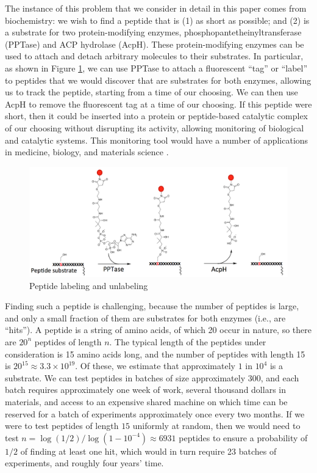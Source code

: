 \documentclass[opre,nonblindrev]{informs3} %
\begin{document}
The instance of this problem that we consider in detail in this paper comes from biochemistry: we wish to find a peptide that is (1) as short as possible; and (2) is a substrate for two protein-modifying enzymes, phosphopantetheinyltransferase (PPTase) and ACP hydrolase (AcpH). These protein-modifying enzymes can be used to attach and detach arbitrary molecules to their substrates.  In particular, as shown in Figure \ref{fig:labeling}, we can use PPTase to attach a fluorescent ``tag'' or ``label'' to peptides that we would discover that are substrates for both enzymes, allowing us to track the peptide, starting from a time of our choosing.  We can then use AcpH to remove the fluorescent tag at a time of our choosing.  If this peptide were short, then it could be inserted into a protein or peptide-based catalytic complex of our choosing without disrupting its activity, allowing monitoring of biological and catalytic systems.  This monitoring tool would have a number of applications in medicine, biology, and materials science \citep{nick}.

\begin{figure}[hpt] 
\center
\includegraphics[width=\textwidth]{pic/labeling.png}
\caption{ Peptide labeling and unlabeling}
\label{fig:labeling}
\end{figure}

Finding such a peptide is challenging, because the number of peptides is large, and only a small fraction of them are substrates for both enzymes (i.e., are ``hits'').  A peptide is a string of amino acids, of which 20 occur in nature, so there are $20^n$ peptides of length $n$.  The typical length of the peptides under consideration is 15 amino acids long, and the number of peptides with length 15 is $20^{15} \approx 3.3 \times 10^{19}$.  Of these, we estimate that approximately $1$ in $10^4$ is a substrate. We can test peptides in batches of size approximately $300$, and each batch requires approximately one week of work, several thousand dollars in materials, and access to an expensive shared machine on which time can be reserved for a batch of experiments approximately once every two months. If we were to test peptides of length $15$ uniformly at random, then we would need to test $n = \log(1/2) / \log(1-10^{-4}) \approx 6931$ peptides to ensure a probability of $1/2$ of finding at least one hit, which would in turn require 23 batches of experiments, and roughly four years' time.
\end{document}
